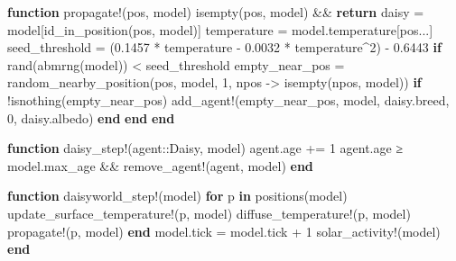 \documentclass[
  english,
  russian,
  12pt,
  a4paper,
  DIV=11,
  numbers=noendperiod]{scrreprt}
\newenvironment{Shaded}{\begin{snugshade}}{\end{snugshade}}
\newcommand{\ControlFlowTok}[1]{\textcolor[rgb]{0.00,0.23,0.31}{\textbf{#1}}}
\newcommand{\DataTypeTok}[1]{\textcolor[rgb]{0.68,0.00,0.00}{#1}}
\newcommand{\FloatTok}[1]{\textcolor[rgb]{0.68,0.00,0.00}{#1}}
\newcommand{\FunctionTok}[1]{\textcolor[rgb]{0.28,0.35,0.67}{#1}}
\newcommand{\KeywordTok}[1]{\textcolor[rgb]{0.00,0.23,0.31}{\textbf{#1}}}
\newcommand{\NormalTok}[1]{\textcolor[rgb]{0.00,0.23,0.31}{#1}}
\newcommand{\OperatorTok}[1]{\textcolor[rgb]{0.37,0.37,0.37}{#1}}
\begin{document}
\begin{Shaded}
\begin{Highlighting}[]
\KeywordTok{function} \FunctionTok{propagate!}\NormalTok{(pos, model)}
    \FunctionTok{isempty}\NormalTok{(pos, model) }\OperatorTok{\&\&} \ControlFlowTok{return}
\NormalTok{    daisy }\OperatorTok{=}\NormalTok{ model[}\FunctionTok{id\_in\_position}\NormalTok{(pos, model)]}
\NormalTok{    temperature }\OperatorTok{=}\NormalTok{ model.temperature[pos}\OperatorTok{...}\NormalTok{]}
\NormalTok{    seed\_threshold }\OperatorTok{=}\NormalTok{ (}\FloatTok{0.1457} \OperatorTok{*}\NormalTok{ temperature }\OperatorTok{{-}} \FloatTok{0.0032} \OperatorTok{*}\NormalTok{ temperature}\OperatorTok{\^{}}\FloatTok{2}\NormalTok{) }\OperatorTok{{-}} \FloatTok{0.6443}
    \ControlFlowTok{if} \FunctionTok{rand}\NormalTok{(}\FunctionTok{abmrng}\NormalTok{(model)) }\OperatorTok{\textless{}}\NormalTok{ seed\_threshold}
\NormalTok{        empty\_near\_pos }\OperatorTok{=} \FunctionTok{random\_nearby\_position}\NormalTok{(pos, model, }\FloatTok{1}\NormalTok{, npos }\OperatorTok{{-}\textgreater{}} \FunctionTok{isempty}\NormalTok{(npos, model))}
        \ControlFlowTok{if}\NormalTok{ !}\FunctionTok{isnothing}\NormalTok{(empty\_near\_pos)}
            \FunctionTok{add\_agent!}\NormalTok{(empty\_near\_pos, model, daisy.breed, }\FloatTok{0}\NormalTok{, daisy.albedo)}
        \ControlFlowTok{end}
    \ControlFlowTok{end}
\KeywordTok{end}

\KeywordTok{function} \FunctionTok{daisy\_step!}\NormalTok{(agent}\OperatorTok{::}\DataTypeTok{Daisy}\NormalTok{, model)}
\NormalTok{    agent.age }\OperatorTok{+=} \FloatTok{1}
\NormalTok{    agent.age }\OperatorTok{≥}\NormalTok{ model.max\_age }\OperatorTok{\&\&} \FunctionTok{remove\_agent!}\NormalTok{(agent, model)}
\KeywordTok{end}

\KeywordTok{function} \FunctionTok{daisyworld\_step!}\NormalTok{(model)}
    \ControlFlowTok{for}\NormalTok{ p }\KeywordTok{in} \FunctionTok{positions}\NormalTok{(model)}
        \FunctionTok{update\_surface\_temperature!}\NormalTok{(p, model)}
        \FunctionTok{diffuse\_temperature!}\NormalTok{(p, model)}
        \FunctionTok{propagate!}\NormalTok{(p, model)}
    \ControlFlowTok{end}
\NormalTok{    model.tick }\OperatorTok{=}\NormalTok{ model.tick }\OperatorTok{+} \FloatTok{1}
    \FunctionTok{solar\_activity!}\NormalTok{(model)}
\KeywordTok{end}


\end{Highlighting}
\end{Shaded}
\end{document}
